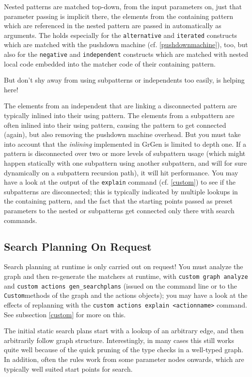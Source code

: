 Nested patterns are matched top-down, from the input parameters on, just that parameter passing is implicit there, the elements from the containing pattern which are referenced in the nested pattern are passed in automatically as arguments.
The holds especially for the \texttt{alternative} and \texttt{iterated} constructs which are matched with the pushdown machine (cf. \ref{pushdownmachine}), too, but also for the \texttt{negative} and \texttt{independent} constructs which are matched with nested local code embedded into the matcher code of their containing pattern.

But don't shy away from using subpatterns or independents too easily,  is helping here!

The elements from an independent that are linking a disconnected pattern are typically inlined into their using pattern.
The elements from a subpattern are often inlined into their using pattern, causing the pattern to get connected (again), 
but also removing the pushdown machine overhead.
But you must take into account that the \emph{inlining} implemented in GrGen is limited to depth one.
If a pattern is disconnected over two or more levels of subpattern usage (which might happen statically with one subpattern using another subpattern, and will for sure dynamically on a subpattern recursion path), it will hit performance.
You may have a look at the output of the \texttt{explain} command (cf. \ref{custom}) to see if the subpatterns are disconnected; this is typically indicated by multiple lookups in the containing pattern, and the fact that the starting points passed as preset parameters to the nested or subpatterns get connected only there with search commands.


\subsection{Search Planning On Request}
Search planning at runtime is only carried out on request!
You must analyze the graph and then re-generate the matchers at runtime,
with \texttt{custom graph analyze} and \texttt{custom actions gen\_searchplans} (issued on the command line or to the \texttt{Custom}methods of the graph and the actions objects);
you may have a look at the effects of replanning with the \texttt{custom actions explain <actionname>} command.
See subsection \ref{custom} for more on this.

The initial static search plans start with a lookup of an arbitrary edge, and then arbitrarily follow graph structure.
Interestingly, in many cases this still works quite well because of the quick pruning of the type checks in a well-typed graph.
In addition, often the rules work from some parameter nodes onwards, which are typically well suited start points for search.

